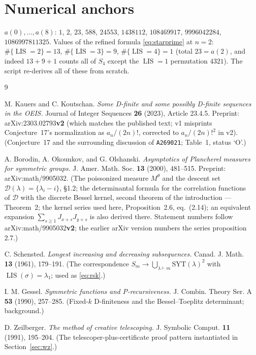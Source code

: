 \documentclass[11pt]{article}
\theoremstyle{plain}
\theoremstyle{definition}
\theoremstyle{remark}
\newcommand{\OEIS}[1]{\texttt{#1}}
\newcommand{\LIS}{\operatorname{LIS}}
\newcommand{\Dset}{\mathcal{D}}
\begin{document}
\section{Numerical anchors}\label{app:cert}

$a(0),\dots,a(8)$: $1$, $2$, $23$, $588$, $24553$, $1438112$, $108469917$, $9996042284$,
$1086997811325$. Values of the refined formula \eqref{eq:starprime} at $n=2$:
$\#\{\LIS=2\}=13$, $\#\{\LIS=3\}=9$, $\#\{\LIS=4\}=1$ (total $23=a(2)$, and indeed $13+9+1$
counts all of $S_4$ except the $\LIS=1$ permutation $4321$). The script re-derives all of these
from scratch.

\begin{thebibliography}{9}

 M. Kauers and C. Koutschan.
\emph{Some D-finite and some possibly D-finite sequences in the OEIS.}
Journal of Integer Sequences \textbf{26} (2023), Article 23.4.5.
Preprint: arXiv:2303.02793\textbf{v2} (which matches the published text; v1 misprints
Conjecture~17's normalization as $a_n/(2n)!$, corrected to $a_n/(2n)!^{2}$ in v2).
(Conjecture~17 and the surrounding discussion of \OEIS{A269021}; Table~1, status `O'.)

 A. Borodin, A. Okounkov, and G. Olshanski.
\emph{Asymptotics of Plancherel measures for symmetric groups.}
J. Amer. Math. Soc. \textbf{13} (2000), 481--515. Preprint: arXiv:math/9905032.
(The poissonized measure $M^\theta$ and the descent set $\Dset(\lambda)=\{\lambda_i-i\}$, \S1.2;
the determinantal formula for the correlation functions of $\Dset$ with the discrete Bessel
kernel, second theorem of the introduction --- Theorem~2; the kernel series used here,
Proposition~2.6, eq.~(2.14); an equivalent expansion $\sum_{s\ge1}J_{x+s}J_{y+s}$ is also derived
there. Statement numbers follow arXiv:math/9905032\textbf{v2}; the earlier arXiv version numbers
the series proposition 2.7.)

 C. Schensted.
\emph{Longest increasing and decreasing subsequences.}
Canad. J. Math. \textbf{13} (1961), 179--191.
(The correspondence $S_m\to\bigcup_{\lambda\vdash m}\mathrm{SYT}(\lambda)^2$ with
$\LIS(\sigma)=\lambda_1$; used as \eqref{eq:rsk}.)

 I. M. Gessel.
\emph{Symmetric functions and P-recursiveness.}
J. Combin. Theory Ser. A \textbf{53} (1990), 257--285.
(Fixed-$k$ D-finiteness and the Bessel--Toeplitz determinant; background.)

 D. Zeilberger.
\emph{The method of creative telescoping.}
J. Symbolic Comput. \textbf{11} (1991), 195--204.
(The telescoper-plus-certificate proof pattern instantiated in Section~\ref{sec:wz}.)


\end{thebibliography}
\end{document}
